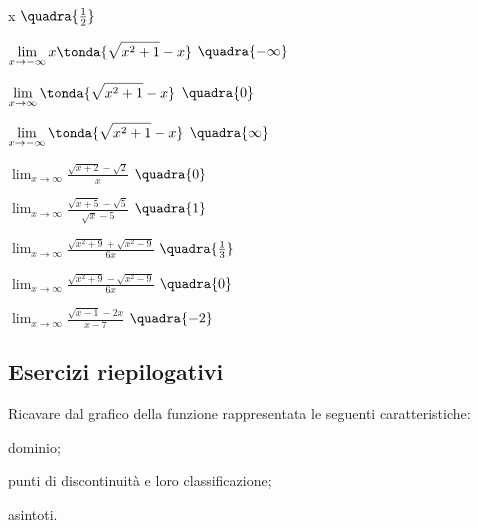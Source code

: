 \begin{esercizio}
\begin{multicols}{2}
\begin{enumeratea}
          x\)
  \hfill \(\quadra{\frac{1}{2}}\)
  \item \(\displaystyle \lim_{x \rightarrow -\infty} 
          x\tonda{\sqrt{x^2+1}-x}\)
  \hfill \(\quadra{-\infty}\)
  \item \(\displaystyle \lim_{x \rightarrow \infty} 
          \tonda{\sqrt{x^2+1}-x}\)
  \hfill \(\quadra{0}\)
  \item \(\displaystyle \lim_{x \rightarrow -\infty} 
          \tonda{\sqrt{x^2+1}-x}\)
  \hfill \(\quadra{\infty}\)
  \item \(\displaystyle \lim_{x \rightarrow \infty} 
          \frac{\sqrt{x+2}-\sqrt{2}}{x}\)
  \hfill \(\quadra{0}\)
  \item \(\displaystyle \lim_{x \rightarrow \infty} 
          \frac{\sqrt{x+5}-\sqrt{5}}{\sqrt{x}-5}\)
  \hfill \(\quadra{1}\)
  \item \(\displaystyle \lim_{x \rightarrow \infty} 
          \frac{\sqrt{x^2+9}+\sqrt{x^2-9}}{6x}\)
  \hfill \(\quadra{\frac{1}{3}}\)
  \item \(\displaystyle \lim_{x \rightarrow \infty} 
          \frac{\sqrt{x^2+9}-\sqrt{x^2-9}}{6x}\)
  \hfill \(\quadra{0}\)
  \item \(\displaystyle \lim_{x \rightarrow \infty} 
          \frac{\sqrt{x-1}-2x}{x-7}\)
  \hfill \(\quadra{-2}\)
 \end{enumeratea}
 \end{multicols}
\end{esercizio}

\subsection{Esercizi riepilogativi}

\begin{esercizio}\label{ese:03.1}
Ricavare dal grafico della funzione rappresentata le seguenti 
caratteristiche:
 \begin{enumeratea}
  \item  dominio;
  \item  punti di discontinuità e loro classificazione;
  \item  asintoti.
 \end{enumeratea}
\begin{center}\continuitagraficoese\end{center} %
\end{esercizio}

